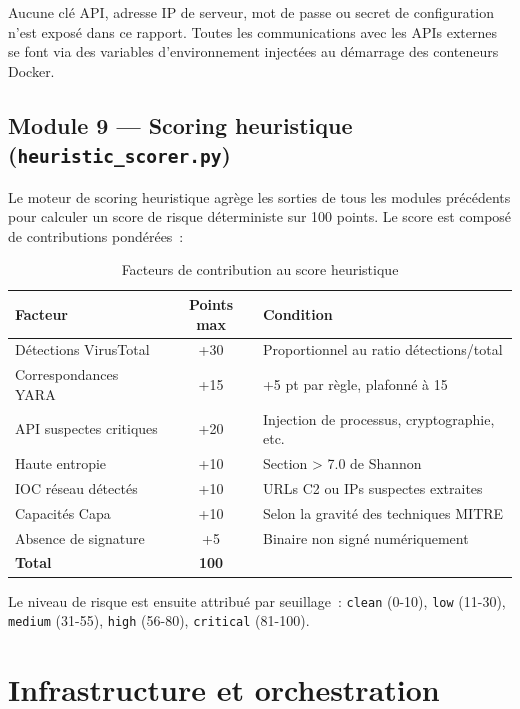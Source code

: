 \begin{notebox}
Aucune clé API, adresse IP de serveur, mot de passe ou secret de configuration n'est exposé dans ce rapport. Toutes les communications avec les APIs externes se font via des variables d'environnement injectées au démarrage des conteneurs Docker.
\end{notebox}

\subsection{Module 9 --- Scoring heuristique (\texttt{heuristic\_scorer.py})}

Le moteur de scoring heuristique agrège les sorties de tous les modules précédents pour calculer un score de risque déterministe sur 100 points. Le score est composé de contributions pondérées~:

\begin{table}[H]
  \centering
  \caption{Facteurs de contribution au score heuristique}
  \label{tab:heuristic_score}
  \begin{tabular}{l c l}
    \toprule
    \textbf{Facteur} & \textbf{Points max} & \textbf{Condition} \\
    \midrule
    Détections VirusTotal & +30 & Proportionnel au ratio détections/total \\
    Correspondances YARA & +15 & +5 pt par règle, plafonné à 15 \\
    API suspectes critiques & +20 & Injection de processus, cryptographie, etc. \\
    Haute entropie & +10 & Section > 7.0 de Shannon \\
    IOC réseau détectés & +10 & URLs C2 ou IPs suspectes extraites \\
    Capacités Capa & +10 & Selon la gravité des techniques MITRE \\
    Absence de signature & +5 & Binaire non signé numériquement \\
    \midrule
    \textbf{Total} & \textbf{100} & \\
    \bottomrule
  \end{tabular}
\end{table}

Le niveau de risque est ensuite attribué par seuillage~: \texttt{clean} (0-10), \texttt{low} (11-30), \texttt{medium} (31-55), \texttt{high} (56-80), \texttt{critical} (81-100).

\section{Infrastructure et orchestration}

